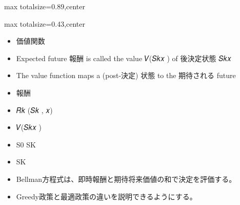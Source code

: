 \begin{minipage}[t]{0.58\textwidth}
\begin{adjustbox}{max totalsize={\textwidth}{0.89\textheight},center}
\begin{minipage}{\textwidth}
\end{minipage}
\end{adjustbox}
\end{minipage}


\clearpage
{}
\begin{minipage}[t]{0.405\textwidth}
\begin{adjustbox}{max totalsize={\textwidth}{0.43\textheight},center}
\begin{minipage}{\textwidth}\scriptsize
{}\begin{itemize}
\item 価値関数
\item Expected future 報酬 is called the value 𝑉(𝑆𝑘𝑥 ) of 後決定状態 𝑆𝑘𝑥
\item The value function maps a (post-決定) 状態 to the 期待される future
\item 報酬
\item 𝑅𝑘 (𝑆𝑘 , 𝑥)
\item 𝑉(𝑆𝑘𝑥 )
\item S0 SK
\item SK
\end{itemize}\begin{itemize}
\item Bellman方程式は、即時報酬と期待将来価値の和で決定を評価する。
\item Greedy政策と最適政策の違いを説明できるようにする。
\end{itemize}
\end{minipage}
\end{adjustbox}
\end{minipage}\hfill
